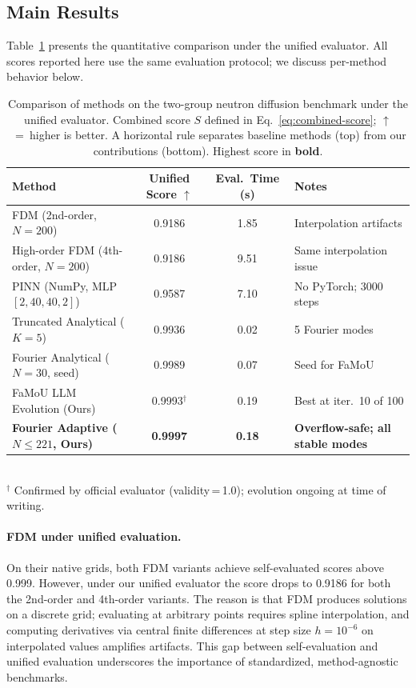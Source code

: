 \subsection{Main Results}
\label{sec:main-results}

Table~\ref{tab:main_results} presents the quantitative comparison under the unified evaluator. All scores reported here use the same evaluation protocol; we discuss per-method behavior below.

\begin{table}[t]
  \centering
  \caption{Comparison of methods on the two-group neutron diffusion benchmark under the unified evaluator. Combined score $S$ defined in Eq.~\eqref{eq:combined-score}; $\uparrow$~=~higher is better. A horizontal rule separates baseline methods (top) from our contributions (bottom). Highest score in \textbf{bold}.}
  \label{tab:main_results}
  \begin{tabular}{@{}lccl@{}}
    \toprule
    Method & Unified Score $\uparrow$ & Eval.\ Time (s) & Notes \\
    \midrule
    FDM (2nd-order, $N{=}200$)          & 0.9186 & 1.85  & Interpolation artifacts \\
    High-order FDM (4th-order, $N{=}200$) & 0.9186 & 9.51  & Same interpolation issue \\
    PINN (NumPy, MLP $[2{,}40{,}40{,}2]$) & 0.9587 & 7.10  & No PyTorch; 3000 steps \\
    Truncated Analytical ($K{=}5$)       & 0.9936 & 0.02  & 5 Fourier modes \\
    Fourier Analytical ($N{=}30$, seed)  & 0.9989 & 0.07  & Seed for FaMoU \\
    \midrule
    FaMoU LLM Evolution (Ours)          & 0.9993$^\dagger$ & 0.19  & Best at iter.~10 of 100 \\
    \textbf{Fourier Adaptive ($N{\leq}221$, Ours)} & \textbf{0.9997} & \textbf{0.18} & \textbf{Overflow-safe; all stable modes} \\
    \bottomrule
  \end{tabular}
  \vspace{3pt}\\
  {\footnotesize $^\dagger$ Confirmed by official evaluator (validity\,=\,1.0); evolution ongoing at time of writing.}
\end{table}

\paragraph{FDM under unified evaluation.}
On their native grids, both FDM variants achieve self-evaluated scores above 0.999. However, under our unified evaluator the score drops to 0.9186 for both the 2nd-order and 4th-order variants. The reason is that FDM produces solutions on a discrete grid; evaluating at arbitrary points requires spline interpolation, and computing derivatives via central finite differences at step size $h = 10^{-6}$ on interpolated values amplifies artifacts. This gap between self-evaluation and unified evaluation underscores the importance of standardized, method-agnostic benchmarks.

